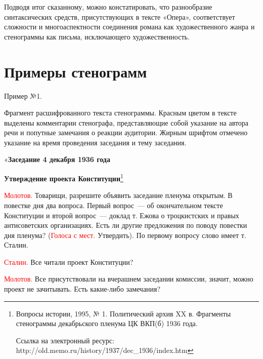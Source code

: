 \documentclass{kursa4}
\begin{document}
{  Подводя итог сказанному, можно констатировать, что разнообразие синтаксических средств, присутствующих в тексте «Опера», соответствует сложности и многоаспектности соединения романа как художественного жанра и стенограммы как письма, исключающего художественность.   

  


   \section*{Примеры стенограмм}

    Пример №1. 

    Фрагмент расшифрованного текста стенограммы. Красным цветом в тексте
    выделены комментарии стенографа, представляющие собой указание на
    автора речи и попутные замечания о реакции аудитории. Жирным шрифтом
    отмечено указание на время проведения заседания и тему заседания.

    «\textbf{{Заседание 4 декабря 1936 года}}

    \textbf{{Утверждение проекта Конституции}}\footnote{
    Вопросы истории, 1995, № 1. Политический архив XX в. Фрагменты
    стенограммы декабрьского пленума ЦК ВКП(б) 1936 года.\par Ссылка на
    электронный ресурс:
    http://old.memo.ru/history/1937/dec\_1936/index.htm}

    \textcolor{red}{Молотов.}{
    Товарищи, разрешите объявить заседание пленума открытым. В повестке дня
    два вопроса. Первый вопрос~--- об окончательном тексте Конституции и
    второй вопрос~--- доклад т. Ежова о троцкистских и правых антисоветских
    организациях. Есть ли другие предложения по поводу повестки дня
    пленума? (}\textcolor{red}{Голоса с
    мест.}{ Утвердить). По первому вопросу слово имеет т.
    Сталин.}

    \textcolor{red}{Сталин.}{
    Все читали проект Конституции?}

    \textcolor{red}{Молотов.}{
    Все присутствовали на вчерашнем заседании комиссии, значит, можно
    проект не зачитывать. Есть какие-либо замечания?}

}
\end{document}
